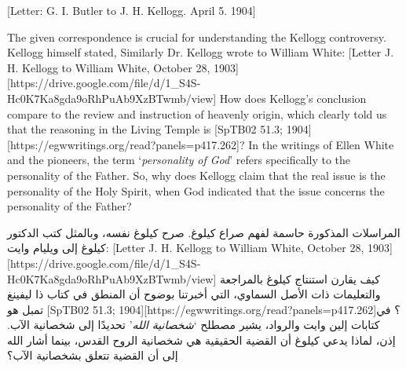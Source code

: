 [Letter: G. I. Butler to J. H. Kellogg. April 5. 1904]


The given correspondence is crucial for understanding the Kellogg controversy. Kellogg himself stated,  Similarly Dr. Kellogg wrote to William White: [Letter J. H. Kellogg to William White, October 28, 1903][https://drive.google.com/file/d/1\_S4S-Hc0K7Ka8gda9oRhPuAb9XzBTwmb/view] How does Kellogg's conclusion compare to the review and instruction of heavenly origin, which clearly told us that the reasoning in the Living Temple is [SpTB02 51.3; 1904][https://egwwritings.org/read?panels=p417.262]? In the writings of Ellen White and the pioneers, the term ‘\textit{personality of God}’ refers specifically to the personality of the Father. So, why does Kellogg claim that the real issue is the personality of the Holy Spirit, when God indicated that the issue concerns the personality of the Father?


المراسلات المذكورة حاسمة لفهم صراع كيلوغ. صرح كيلوغ نفسه،  وبالمثل كتب الدكتور كيلوغ إلى ويليام وايت: [Letter J. H. Kellogg to William White, October 28, 1903][https://drive.google.com/file/d/1\_S4S-Hc0K7Ka8gda9oRhPuAb9XzBTwmb/view] كيف يقارن استنتاج كيلوغ بالمراجعة والتعليمات ذات الأصل السماوي، التي أخبرتنا بوضوح أن المنطق في كتاب ذا ليفينغ تمبل هو [SpTB02 51.3; 1904][https://egwwritings.org/read?panels=p417.262]؟ في كتابات إلين وايت والرواد، يشير مصطلح ‘\textit{شخصانية الله}’ تحديدًا إلى شخصانية الآب. إذن، لماذا يدعي كيلوغ أن القضية الحقيقية هي شخصانية الروح القدس، بينما أشار الله إلى أن القضية تتعلق بشخصانية الآب؟


